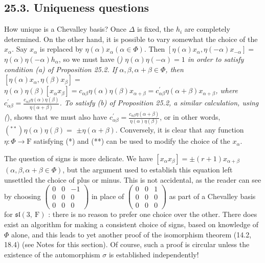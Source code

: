 \documentclass[10pt]{article}
\begin{document}
\subsection*{25.3. Uniqueness questions}
How unique is a Chevalley basis? Once $\Delta$ is fixed, the $h_{i}$ are completely determined. On the other hand, it is possible to vary somewhat the choice of the $x_{\alpha}$. Say $x_{\alpha}$ is replaced by $\eta(\alpha) x_{\alpha}(\alpha \in \Phi)$. Then $\left[\eta(\alpha) x_{\alpha}, \eta(-\alpha) x_{-\alpha}\right]=$ $\eta(\alpha) \eta(-\alpha) h_{\alpha}$, so we must have (\textit{) $\eta(\alpha) \eta(-\alpha)=1$ in order to satisfy condition (a) of Proposition 25.2. If $\alpha, \beta, \alpha+\beta \in \Phi$, then $\left[\eta(\alpha) x_{\alpha}, \eta(\beta) x_{\beta}\right]=$ $\eta(\alpha) \eta(\beta)\left[x_{\alpha} x_{\beta}\right]=c_{\alpha \beta} \eta(\alpha) \eta(\beta) x_{\alpha+\beta}=c_{\alpha \beta}^{\prime} \eta(\alpha+\beta) x_{\alpha+\beta}$, where $c_{\alpha \beta}^{\prime}=\frac{c_{\alpha \beta} \eta(\alpha) \eta(\beta)}{\eta(\alpha+\beta)}$. To satisfy (b) of Proposition 25.2, a similar calculation, using (}), shows that we must also have $c_{\alpha \beta}^{\prime}=\frac{c_{\alpha \beta} \eta(\alpha+\beta)}{\eta(\alpha) \eta(\beta)}$, or in other words, $\left({ }^{* *}\right) \eta(\alpha) \eta(\beta)=$ $\pm \eta(\alpha+\beta)$. Conversely, it is clear that any function $\eta: \Phi \rightarrow \mathrm{F}$ satisfying (*) and (**) can be used to modify the choice of the $x_{\alpha}$.

The question of signs is more delicate. We have $\left[x_{\alpha} x_{\beta}\right]= \pm(r+1) x_{\alpha+\beta}$ $(\alpha, \beta, \alpha+\beta \in \Phi)$, but the argument used to establish this equation left unsettled the choice of plus or minus. This is not accidental, as the reader can see by choosing $\left(\begin{array}{rrr}0 & 0 & -1 \\ 0 & 0 & 0 \\ 0 & 0 & 0\end{array}\right)$ in place of $\left(\begin{array}{lll}0 & 0 & 1 \\ 0 & 0 & 0 \\ 0 & 0 & 0\end{array}\right)$ as part of a Chevalley basis for $\mathfrak{s l}(3, \mathrm{~F})$ : there is no reason to prefer one choice over the other. There does exist an algorithm for making a consistent choice of signs, based on knowledge of $\Phi$ alone, and this leads to yet another proof of the isomorphism theorem (14.2, 18.4) (see Notes for this section). Of course, such a proof is circular unless the existence of the automorphism $\sigma$ is established independently!
\end{document}
